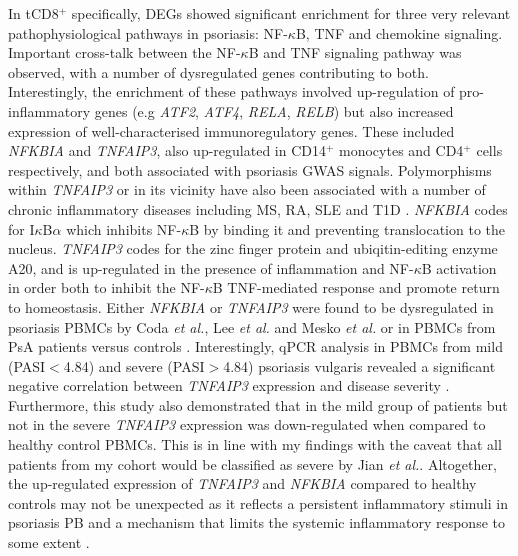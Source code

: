 In tCD8$^+$ specifically, DEGs showed significant enrichment for three very relevant pathophysiological pathways in psoriasis: NF-$\kappa$B, TNF and chemokine signaling. Important cross-talk between the NF-$\kappa$B and TNF signaling pathway was observed, with a number of dysregulated genes contributing to both. Interestingly, the enrichment of these pathways involved up-regulation of pro-inflammatory genes (e.g \textit{ATF2}, \textit{ATF4}, \textit{RELA}, \textit{RELB}) but also increased expression of well-characterised immunoregulatory genes. These included \textit{NFKBIA} and \textit{TNFAIP3}, also up-regulated in CD14$^+$ monocytes and CD4$^+$ cells respectively, and both associated with psoriasis GWAS signals.  Polymorphisms within \textit{TNFAIP3} or in its vicinity have also been associated with a number of chronic inflammatory diseases including MS, RA, SLE and T1D \parencite{Vereecke2011}. \textit{NFKBIA} codes for I$\kappa$B$\alpha$ which inhibits NF-$\kappa$B by binding it and preventing translocation to the nucleus. \textit{TNFAIP3} codes for the zinc finger protein and ubiqitin-editing enzyme A20, and is up-regulated in the presence of inflammation and NF-$\kappa$B activation in order both to inhibit the NF-$\kappa$B TNF-mediated response and promote return to homeostasis. Either \textit{NFKBIA} or \textit{TNFAIP3} were found to be dysregulated in psoriasis PBMCs by Coda \textit{et al.}, Lee \textit{et al.} and Mesko \textit{et al.} or in PBMCs from PsA patients versus controls \parencite{Dolcino2015}. Interestingly, qPCR analysis in PBMCs from mild (PASI$<$4.84) and severe (PASI$>$4.84) psoriasis vulgaris revealed a significant negative correlation between \textit{TNFAIP3} expression and disease severity \parencite{Jiang2012}. Furthermore, this study also demonstrated that in the mild group of patients but not in the severe \textit{TNFAIP3} expression was down-regulated when compared to healthy control PBMCs. This is in line with my findings with the caveat that all patients from my cohort would be classified as severe by Jian \textit{et al.}. Altogether, the up-regulated expression of \textit{TNFAIP3} and \textit{NFKBIA} compared to healthy controls may not be unexpected as it reflects a persistent inflammatory stimuli in psoriasis PB and a mechanism that limits the systemic inflammatory response to some extent \parencite{Idel2003}. 

